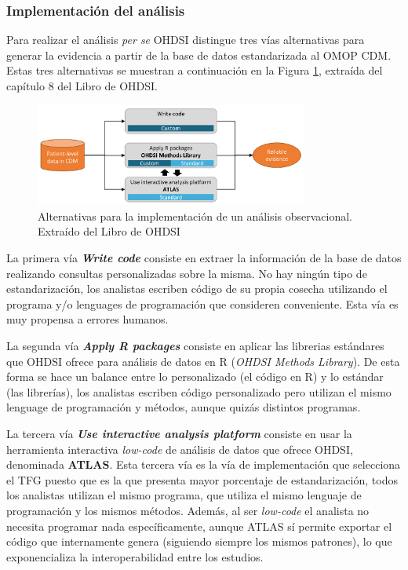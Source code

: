 \subsubsection{Implementación del análisis}

Para realizar el análisis \textit{per se} OHDSI distingue tres vías alternativas para generar la evidencia a partir de la base de datos estandarizada al OMOP CDM. Estas tres alternativas se muestran a continuación en la Figura \ref{fig:analysisImplementations }, extraída del capítulo 8 del Libro de OHDSI.

\begin{figure}[H]
    \centering
    \includegraphics[width=0.80\textwidth]{figures/analysisImplementations.png}
     \caption{Alternativas para la implementación de un análisis observacional. Extraído del Libro de OHDSI \cite{OHDSIbook}}
    \label{fig:analysisImplementations }
\end{figure}

La primera vía \textbf{\textit{Write code}} consiste en extraer la información de la base de datos realizando consultas personalizadas sobre la misma. No hay ningún tipo de estandarización, los analistas escriben código de su propia cosecha utilizando el programa y/o lenguages de programación que consideren conveniente. Esta vía es muy propensa a errores humanos.

La segunda vía \textbf{\textit{Apply R packages}} consiste en aplicar las librerias estándares que OHDSI ofrece para análisis de datos en R (\textit{OHDSI Methods Library}). De esta forma se hace un balance entre lo personalizado (el código en R) y lo estándar (las librerías), los analistas escriben código personalizado pero utilizan el mismo lenguage de programación y métodos, aunque quizás distintos programas.

La tercera vía \textbf{\textit{Use interactive analysis platform}} consiste en usar la herramienta interactiva \textit{low-code} de análisis de datos que ofrece OHDSI, denominada \textbf{ATLAS}. Esta tercera vía es la vía de implementación que selecciona el TFG puesto que es la que presenta mayor porcentaje de estandarización, todos los analistas utilizan el mismo programa, que utiliza el mismo lenguaje de programación y los mismos métodos. Además, al ser \textit{low-code} el analista no necesita programar nada específicamente, aunque ATLAS sí permite exportar el código que internamente genera (siguiendo siempre los mismos patrones), lo que exponencializa la interoperabilidad entre los estudios.

